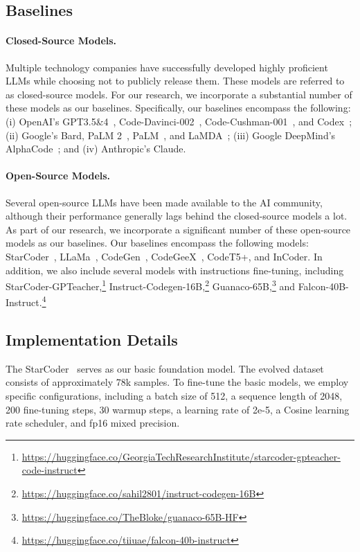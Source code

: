 \documentclass{article}
\begin{document}
\subsection{Baselines}

\paragraph{Closed-Source Models.} Multiple technology companies have successfully developed highly proficient LLMs while choosing not to publicly release them. These models are referred to as closed-source models. For our research, we incorporate a substantial number of these models as our baselines. Specifically, our baselines encompass the following: (i) OpenAI's GPT3.5\&4~\cite{GPT4}, Code-Davinci-002~\cite{Azure}, Code-Cushman-001~\cite{Azure}, and Codex~\cite{codex}; (ii) Google's Bard, PaLM 2~\cite{palm2}, PaLM~\cite{PaLM}, and LaMDA~\cite{LaMDA}; (iii) Google DeepMind's AlphaCode~\cite{AlphaCode}; and (iv) Anthropic's Claude.

\paragraph{Open-Source Models.} Several open-source LLMs have been made available to the AI community, although their performance generally lags behind the closed-source models a lot. As part of our research, we incorporate a significant number of these open-source models as our baselines. Our baselines encompass the following models: StarCoder~\cite{li2023starcoder}, LLaMa~\cite{llama}, CodeGen~\cite{codegen}, CodeGeeX~\cite{CodeGeeX}, CodeT5+\cite{CodeT5+}, and InCoder\cite{incoder}. In addition, we also include several models with instructions fine-tuning, including StarCoder-GPTeacher,\footnote{\url{https://huggingface.co/GeorgiaTechResearchInstitute/starcoder-gpteacher-code-instruct}} Instruct-Codegen-16B,\footnote{\url{https://huggingface.co/sahil2801/instruct-codegen-16B}} Guanaco-65B,\footnote{\url{https://huggingface.co/TheBloke/guanaco-65B-HF}} and Falcon-40B-Instruct.\footnote{\url{https://huggingface.co/tiiuae/falcon-40b-instruct}}

\subsection{Implementation Details}

The StarCoder~\cite{li2023starcoder} serves as our basic foundation model. The evolved dataset consists of approximately 78k samples. To fine-tune the basic models, we employ specific configurations, including a batch size of 512, a sequence length of 2048, 200 fine-tuning steps, 30 warmup steps, a learning rate of 2e-5, a Cosine learning rate scheduler, and fp16 mixed precision.
\end{document}
